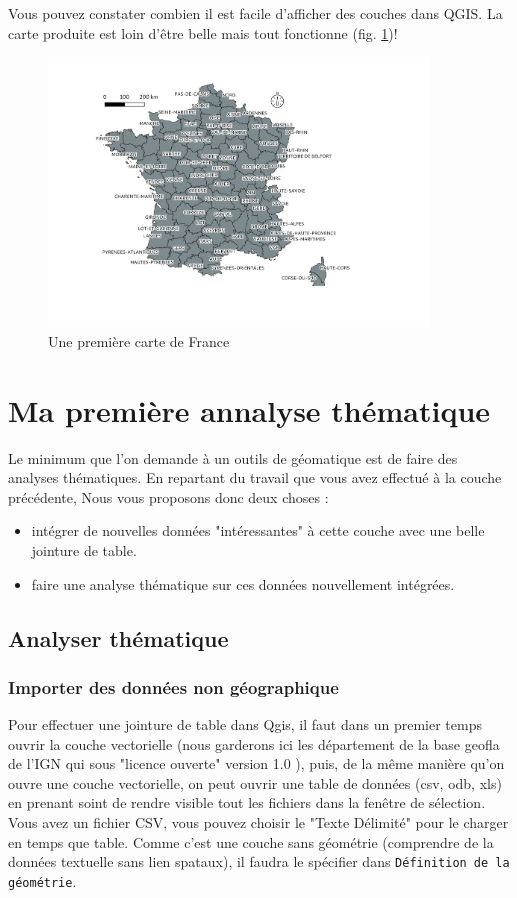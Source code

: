 \documentclass[a4paper, 11pt]{article}
\begin{document}
Vous pouvez constater combien il est facile d’afficher des couches dans QGIS. La carte produite est loin d'être belle mais tout fonctionne (fig. \ref{fig:carte1})!

\begin{figure}
\centering
  \includegraphics[width=0.9\textwidth]{img/carte_france1}
  \caption{Une première carte de France}\label{fig:carte1}
\end{figure}

\section{Ma première annalyse thématique}
Le minimum que l'on demande à un outils de géomatique est de faire des analyses thématiques. En repartant du travail que vous avez effectué à la couche précédente, Nous vous proposons donc deux choses :
  \begin{itemize}
    \item intégrer de nouvelles données "intéressantes" à cette couche avec une belle jointure de table.
    \item faire une analyse thématique sur ces données nouvellement intégrées.
  \end{itemize}

  \subsection{Analyser thématique}
  \subsubsection{Importer des données non géographique}
  Pour effectuer une jointure de table dans Qgis, il faut dans un premier temps ouvrir la couche vectorielle (nous garderons ici les département de la base geofla de l'IGN qui sous "licence ouverte" version 1.0 ), puis, de la même manière qu'on ouvre une couche vectorielle, on peut ouvrir une table de données (csv, odb, xls) en prenant soint de rendre visible tout les fichiers dans la fenêtre de sélection. Vous avez un fichier CSV, vous pouvez choisir le "Texte Délimité" pour le charger en temps que table. Comme c'est une couche sans géométrie (comprendre de la données textuelle sans lien spataux), il faudra le spécifier dans \texttt{Définition de la géométrie}.
\end{document}
